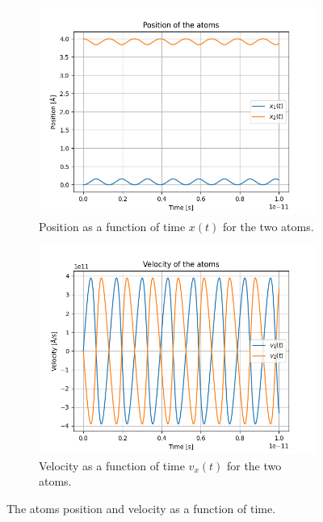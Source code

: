 \documentclass[a4paper]{article}
\begin{document}
\begin{figure}[H]
    \centering
    \begin{subfigure}[b]{0.45\textwidth}
        \centering
        \includegraphics[width=\textwidth]{Position of the atoms.png}
        \caption{Position as a function of time $x(t)$ for the two atoms.}
        \label{fig: Position}
    \end{subfigure}
    \hfill
    \begin{subfigure}[b]{0.45\textwidth}
        \centering
        \includegraphics[width=\textwidth]{Velocity of the atoms.png}
        \caption{Velocity as a function of time $v_x(t)$ for the two atoms.}
        \label{fig: Velocity}
    \end{subfigure}
    \caption{The atoms position and velocity as a function of time.}
    \label{fig: Position & Velocity}
\end{figure}\noindent
\end{document}
